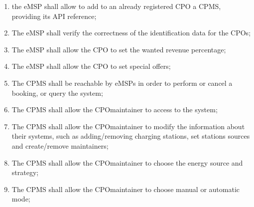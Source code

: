 \begin{enumerate}[label=\textbf{R\arabic*}]
    \item the \ac{eMSP} shall allow to add to an already registered \ac{CPO} a \ac{CPMS}, providing its \ac{API} reference;\label{req:eMSP-add-cpms}
    \item The \ac{eMSP} shall verify the correctness of the identification data for the \acp{CPO};\label{req:eMSP-correct-cpo-info}
    \item The \ac{eMSP} shall allow the \ac{CPO} to set the wanted revenue percentage;\label{req:eMSP-set-revenue}
    \item The \ac{eMSP} shall allow the \ac{CPO} to set special offers;\label{req:eMSP-set-special-offers}
    \item The \ac{CPMS} shall be reachable by \acp{eMSP} in order to perform or cancel a booking, or query the system;\label{req:CPMS-reachable}
    \item The \ac{CPMS} shall allow the \ac{CPO}maintainer to access to the system;\label{req:CPMS-accessible}
    \item The \ac{CPMS} shall allow the \ac{CPO}maintainer to modify the information about their systems, such as adding/removing charging stations, set stations sources and create/remove maintainers;\label{req:CPMS-modify-cpo-infos}
    \item The \ac{CPMS} shall allow the \ac{CPO}maintainer to choose the energy source and strategy;\label{req:CPMS-select-source-strategy}
    \item The \ac{CPMS} shall allow the \ac{CPO}maintainer to choose manual or automatic mode;\label{req:CPMS-select-mode}
\end{enumerate}

